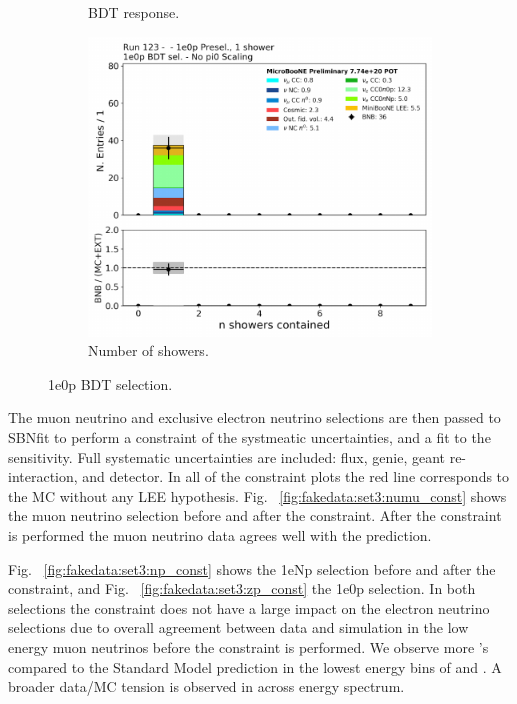 \begin{figure}[H]
\begin{center}
\begin{subfigure}[b]{0.3\textwidth}
    \caption{\label{fig:fakedata:set3:zp_postsel_bdt} BDT response.}
    \end{subfigure}
    \begin{subfigure}[b]{0.3\textwidth}
    \centering
    \includegraphics[width=1.00\textwidth]{Fakedata/set3/zp_postsel_nshr.pdf}
    \caption{\label{fig:fakedata:set3:zp_postsel_nshr} Number of showers.}
    \end{subfigure}
\caption{\label{fig:fakedata:set3:zpsel} 1e0p BDT selection.}
\end{center}
\end{figure}

The muon neutrino and exclusive electron neutrino selections are then passed to SBNfit to perform a constraint of the systmeatic uncertainties, and a fit to the sensitivity.  Full systematic uncertainties are included: flux, genie, geant re-interaction, and detector.  In all of the constraint plots the red line corresponds to the MC without any LEE hypothesis. Fig. ~\ref{fig:fakedata:set3:numu_const} shows the muon neutrino selection before and after the constraint. After the constraint is performed the muon neutrino data agrees well with the prediction. 

Fig. ~\ref{fig:fakedata:set3:np_const} shows the 1eNp selection before and after the constraint, and Fig. ~\ref{fig:fakedata:set3:zp_const} the 1e0p selection.  In both selections the constraint does not have a large impact on the electron neutrino selections due to overall agreement between data and simulation in the low energy muon neutrinos before the constraint is performed.  We observe more \nue's compared to the Standard Model prediction in the lowest energy bins of \npsel and \zpsel. A broader data/MC tension is observed in \npsel across energy spectrum.

